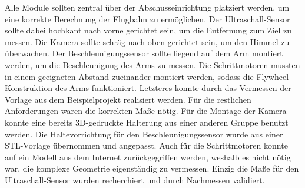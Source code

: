 Alle Module sollten zentral über der Abschusseinrichtung platziert werden, um eine korrekte Berechnung der Flugbahn zu ermöglichen. Der Ultraschall-Sensor sollte dabei hochkant nach vorne gerichtet sein, um die Entfernung zum Ziel zu messen. Die Kamera sollte schräg nach oben gerichtet sein, um den Himmel zu überwachen. Der Beschleunigungssensor sollte liegend auf dem Arm montiert werden, um die Beschleunigung des Arms zu messen. Die Schrittmotoren mussten in einem geeigneten Abstand zueinander montiert werden, sodass die Flywheel-Konstruktion des Arms funktioniert. Letzteres konnte durch das Vermessen der Vorlage aus dem Beispielprojekt realisiert werden. Für die restlichen Anforderungen waren die korrekten Maße nötig. Für die Montage der Kamera konnte eine bereits 3D-gedruckte Halterung aus einer anderen Gruppe benutzt werden. Die Haltevorrichtung für den Beschleunigungssensor wurde aus einer STL-Vorlage übernommen und angepasst. Auch für die Schrittmotoren konnte auf ein Modell aus dem Internet zurückgegriffen werden, weshalb es nicht nötig war, die komplexe Geometrie eigenständig zu vermessen. Einzig die Maße für den Ultraschall-Sensor wurden recherchiert und durch Nachmessen validiert.

